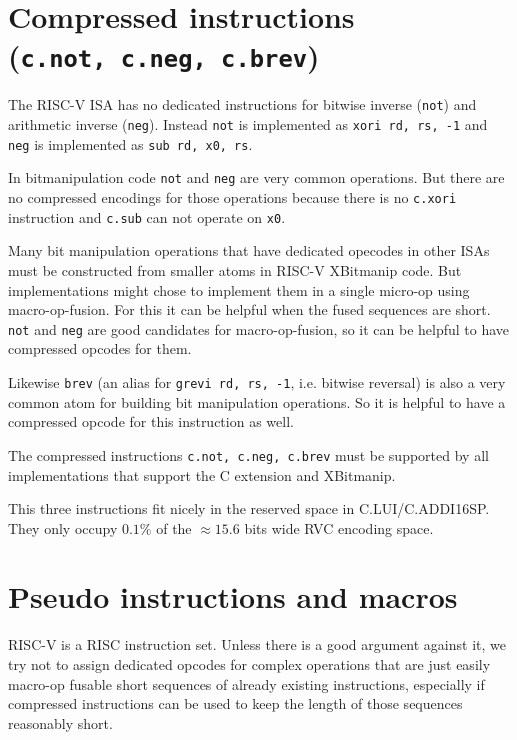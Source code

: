 


\section{Compressed instructions (\texttt{c.not,\ c.neg,\ c.brev})}

The RISC-V ISA has no dedicated instructions for bitwise inverse (\texttt{not})
and arithmetic inverse (\texttt{neg}). Instead \texttt{not} is implemented as
\texttt{xori\ rd,\ rs,\ -1} and \texttt{neg} is implemented as
\texttt{sub\ rd,\ x0,\ rs}.

In bitmanipulation code \texttt{not} and \texttt{neg} are very common operations. But
there are no compressed encodings for those operations because there is no \texttt{c.xori}
instruction and \texttt{c.sub} can not operate on \texttt{x0}.

Many bit manipulation operations that have dedicated opecodes in other ISAs
must be constructed from smaller atoms in RISC-V XBitmanip code. But
implementations might chose to implement them in a single micro-op using
macro-op-fusion. For this it can be helpful when the fused sequences are short.
\texttt{not} and \texttt{neg} are good candidates for macro-op-fusion, so
it can be helpful to have compressed opcodes for them.

Likewise \texttt{brev} (an alias for \texttt{grevi\ rd,\ rs,\ -1}, i.e. bitwise
reversal) is also a very common atom for building bit manipulation operations. So it
is helpful to have a compressed opcode for this instruction as well.

The compressed instructions \texttt{c.not,\ c.neg,\ c.brev} must be supported by
all implementations that support the C extension and XBitmanip.



This three instructions fit nicely in the reserved space in C.LUI/C.ADDI16SP.
They only occupy $0.1\%$ of the $\approx15.6$ bits wide RVC encoding space.


\section{Pseudo instructions and macros}

RISC-V is a RISC instruction set. Unless there is a good argument against it, we try not
to assign dedicated opcodes for complex operations that are just easily macro-op fusable
short sequences of already existing instructions, especially if compressed instructions
can be used to keep the length of those sequences reasonably short.

